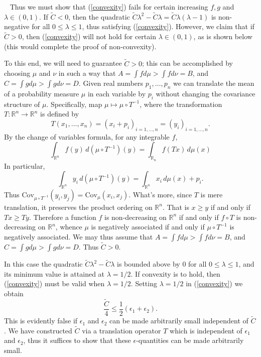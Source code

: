 \documentclass[11pt]{article}
\newcommand{\R}{\mathbb{R}}
\newcommand{\C}{\text{Cov}}
\newenvironment{Proof}{\noindent{\bf Proof} \ }{\QED}\smallskip
\newcommand\QED{\newline \rightline{$\blacksquare$} \bigskip}
\begin{document}
\begin{Proof}
Thus we must show that (\ref{convexity}) fails for certain increasing $f,g$ and $\lambda\in (0,1)$. If $\tilde{C}<0$, then the quadratic $\tilde{C}\lambda^2-\tilde{C}\lambda=\tilde{C}\lambda(\lambda-1)$ is non-negative for
all $0\leq \lambda \leq 1$, thus satisfying (\ref{convexity}). However, we claim that if 
$\tilde{C}>0$, then (\ref{convexity}) will not hold for certain $\lambda\in (0,1)$, as is shown below (this would complete the proof of non-convexity). 

To this end, we will need to guarantee $\tilde{C}>0$; this can be accomplished by choosing $\mu$ and $\nu$ in such a way that $A=\int f d\mu> \int f d\nu =B$, and $C=\int g d\mu >\int g d\nu =D$.
Given real numbers $p_1,\dots, p_n$ we can translate the mean of a probability measure $\mu$ in each variable by $p_i$ without changing the covariance structure of $\mu$. Specifically, map $\mu\mapsto \mu\circ T^{-1}$, where the transformation $T:\R^n\to \R^n$ is defined by 
\[
T(x_1,\dots, x_n) = (x_i+p_i)_{i=1,\dots,n} =(y_i)_{i=1,\dots,n}.
\]
By the change of variables formula, for any integrable $f$,
\[
\int_{\R^n} f(y) \, d(\mu\circ T^{-1})(y) = 
\int_{\R_n} f(Tx) \,d\mu(x) 
\]
In particular,
\[
\int_{\R^n} y_i \, d(\mu\circ T^{-1})(y) = \int_{\R^n}x_i\, d\mu(x) + p_i.
\]
Thus $\C_{\mu\circ T^{-1}}(y_i,y_j) = \C_{\mu}(x_i,x_j)$. What's more,
since $T$ is mere translation, it preserves the product ordering on $\R^n$. That is $x\geq y$ if and only if $Tx\geq Ty$. Therefore a function $f$ is non-decreasing on $\R^n$ if and only if $f\circ T$ is non-decreasing on $\R^n$, whence $\mu$ is negatively associated if and only if $\mu \circ T^{-1}$ is negatively associated.  %
We may thus assume that $A=\int f d\mu> \int f d\nu =B$, and $C=\int g d\mu >\int g d\nu =D$. Thus $\tilde{C}>0$.

In this case the quadratic  $\tilde{C}\lambda^2-\tilde{C}\lambda$ is 
bounded above by 0 for all $0\leq \lambda \leq 1$, and its minimum value is attained at $\lambda=1/2$. If convexity is to hold, then (\ref{convexity}) must be valid when $\lambda=1/2$. Setting $\lambda=1/2$ in (\ref{convexity}) we obtain
\[
\frac{\tilde{C}}{4}\leq \frac{1}{2}(\epsilon_1+\epsilon_2).
\]
This is evidently false if $\epsilon_1$ and $\epsilon_2$ can be made arbitrarily small independent of $\tilde{C}$. %
We have constructed $\tilde{C}$ via a translation operator $T$ which is independent of $\epsilon_1$ and $\epsilon_2$, thus it suffices to show that these $\epsilon$-quantities can be made arbitrarily small. 


\end{Proof}
\end{document}
